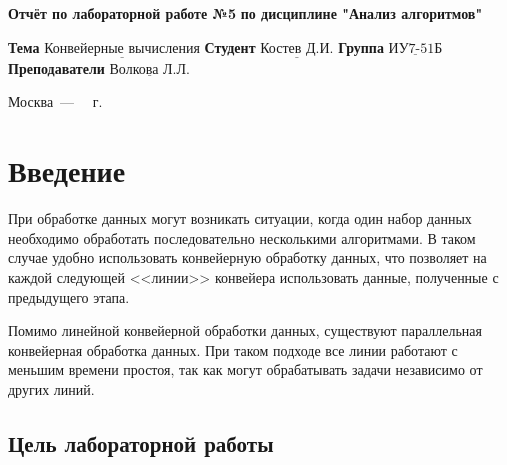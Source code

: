 \documentclass[12pt]{report}
\begin{document}
\begin{titlepage}
	
	\begin{center}
		\noindent\begin{minipage}{1.3\textwidth}\centering
			\Large\textbf{  Отчёт по лабораторной работе №5}\newline
			\textbf{по дисциплине "Анализ алгоритмов"}\newline\newline
		\end{minipage}
	\end{center}
	
	\noindent\textbf{Тема} $\underline{\text{Конвейерные вычисления}}$\newline\newline
	\noindent\textbf{Студент} $\underline{\text{Костев Д.И.}}$\newline\newline
	\noindent\textbf{Группа} $\underline{\text{ИУ7-51Б}}$\newline\newline
	\noindent\textbf{Преподаватели} $\underline{\text{Волкова Л.Л.}}$\newline\newline\newline
	
	\begin{center}
		\vfill
		Москва~---~\the\year
		~г.
	\end{center}
\end{titlepage}

\setcounter{page}{2}
\tableofcontents

\newpage
\chapter*{Введение}

При обработке данных могут возникать ситуации, когда один набор данных необходимо обработать последовательно несколькими алгоритмами. В таком случае удобно использовать конвейерную обработку данных, что позволяет на каждой следующей <<линии>> конвейера использовать данные, полученные с предыдущего этапа. 

Помимо линейной конвейерной обработки данных, существуют параллельная конвейерная обработка данных. При таком подходе все линии работают с меньшим времени простоя, так как могут обрабатывать задачи независимо от других линий.

\section*{Цель лабораторной работы}
\end{document}
